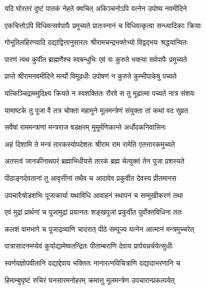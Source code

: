 \twolineshloka
{यदि घोरतरं दुष्टं पातकं नेहते क्वचित्}
{अकिञ्चनोऽपि यत्नेन उपोष्य नवमीदिने}%

\twolineshloka
{एकचित्तोऽपि विधिवत्सर्वपापैः प्रमुच्यते}
{प्रातःस्नानं च विधिवत्कृत्वा सन्ध्यादिकाः क्रियाः}%

\twolineshloka
{गोभूतिलहिरण्यादि दद्याद्वित्तानुसारतः}
{श्रीरामचन्द्रभक्तेभ्यो विद्वद्भयः श्रद्धयान्वितः}%

\twolineshloka
{पारणं त्वथ कुर्वीत ब्राह्मणैश्च स्वबन्धुभिः}
{एवं यः कुरुते भक्त्या सर्वपापैः प्रमुच्यते}%

\twolineshloka
{प्राप्ते श्रीरामनवमीदिने मर्त्यो विमूढधीः}
{उपोषणं न कुरुते कुम्भीपाकेषु पच्यते}%

\twolineshloka
{यत्किञ्चिद्राममुदिक्ष्य क्रियते न स्वशक्तितः}
{रौरवे स तु मूढात्मा पच्यते नात्र संशयः}%

\twolineshloka
{यामाष्टके तु पूजा वै तत्र चोक्ता महामुने}
{मूलमन्त्रेणं संयुक्ता तां कथां वद सुव्रत}%

\twolineshloka
{सर्वेषां राममन्त्राणां मन्त्रराज षडक्षरम्} %
{मुमूर्मणिकान्ते अर्धोदकनिवासिनः}%

\twolineshloka
{अहं दिशामि ते मन्त्रं तारकस्योपदेशतः}
{श्रीराम राम रामेति एतत्तारकमुच्यते}%

\twolineshloka
{अतस्त्वं जानकीनाथपरं ब्रह्माभिधीयसे}
{तारकं ब्रह्म चेत्युक्तं तेन पूजा प्रशस्यते}%

\twolineshloka
{पीठाङ्गदेवतानां तु आवृत्तीनां तथैव च}
{आदावेव प्रकुर्वीत देवस्य प्रीतमानस}%

\twolineshloka
{उपचारैःषोडशभिः पूजाकार्या यथाविधि}
{आवाहनं स्थापनं च सम्मुखीकरणं तथा}%

\twolineshloka
{एवं मुद्रां प्रार्थनां च पूजामुद्रां प्रयत्नतः}
{शङ्खपूजां प्रकुर्वीत पूर्वोक्तविधिना ततः}%

\twolineshloka
{कलशं वामभागे च पूजाद्रव्याणि चादरात्}
{पीठे सम्पूज्य यत्नेन आत्मानं मन्त्रमुच्चरेत्}%

\twolineshloka
{पात्रासादनमप्येवं कुर्याद्यामेष्वतन्द्रितः}
{पीताम्बराणि देवाय प्रार्पयन्नर्चयेत्सुधीः}%

\twolineshloka
{स्वर्णयज्ञोपवीतानि दद्याद्देवाय भक्तितः}
{नानारत्नविचित्राणि दद्यादाभरणानि च}%

\twolineshloka
{हिमाम्बुघृष्टं रुचिरं घनसारमनोहरम्}
{क्रमात्तु मूलमन्त्रेण उपचारान्प्रकल्पयेत्}%

